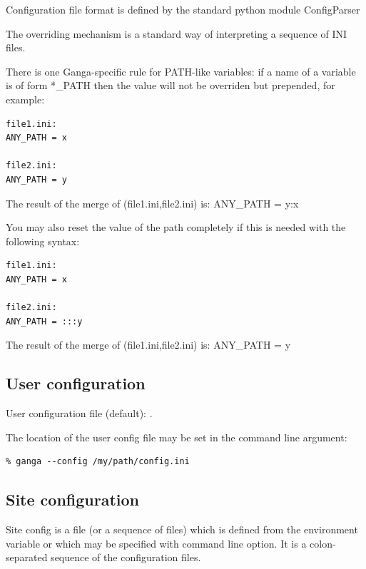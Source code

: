 \documentclass{howto}
\begin{document}
\begin{seealso}
Configuration file format  is defined by the standard python module ConfigParser

The overriding mechanism is a standard way of interpreting a sequence of INI files.

There is one Ganga-specific rule for PATH-like variables: if a name of a variable is of form *_PATH then the value will not be overriden but
prepended, for example:

\begin{verbatim}
file1.ini:
ANY_PATH = x

file2.ini:
ANY_PATH = y
\end{verbatim}

The result of the merge of (file1.ini,file2.ini) is: ANY_PATH = y:x

You may also reset the value of the path completely if this is needed with the following syntax:
\begin{verbatim}
file1.ini:
ANY_PATH = x

file2.ini:
ANY_PATH = :::y
\end{verbatim}

The result of the merge of (file1.ini,file2.ini) is: ANY_PATH = y

\end{seealso}

\subsection{User configuration}

User configuration file (default): .

The location of the user config file may be set in the command line argument: 
\begin{verbatim}
% ganga --config /my/path/config.ini
\end{verbatim}


\subsection{Site configuration}

Site config is  a file (or a sequence of files)  which is defined from
the    environment  variable  or which  may  be
specified  with   command  line  option.  It is  a
colon-separated sequence of the configuration files. 
\end{document}
